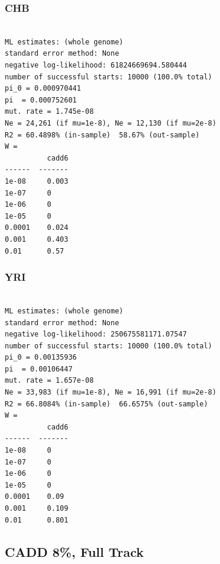 \documentclass[11pt]{article}
\begin{document}
\subsubsection*{CHB}
\begin{minipage}{\linewidth}\begin{footnotesize}
\begin{verbatim}

ML estimates: (whole genome)
standard error method: None
negative log-likelihood: 61824669694.580444
number of successful starts: 10000 (100.0% total)
pi_0 = 0.000970441
pi  = 0.000752601
mut. rate = 1.745e-08 
Ne = 24,261 (if mu=1e-8), Ne = 12,130 (if mu=2e-8)
R2 = 60.4898% (in-sample)  58.67% (out-sample)
W = 
          cadd6
------  -------
1e-08     0.003
1e-07     0
1e-06     0
1e-05     0
0.0001    0.024
0.001     0.403
0.01      0.57
\end{verbatim}
\end{footnotesize}\end{minipage}


\subsubsection*{YRI}
\begin{minipage}{\linewidth}\begin{footnotesize}
\begin{verbatim}

ML estimates: (whole genome)
standard error method: None
negative log-likelihood: 250675581171.07547
number of successful starts: 10000 (100.0% total)
pi_0 = 0.00135936
pi  = 0.00106447
mut. rate = 1.657e-08 
Ne = 33,983 (if mu=1e-8), Ne = 16,991 (if mu=2e-8)
R2 = 66.8084% (in-sample)  66.6575% (out-sample)
W = 
          cadd6
------  -------
1e-08     0
1e-07     0
1e-06     0
1e-05     0
0.0001    0.09
0.001     0.109
0.01      0.801
\end{verbatim}
\end{footnotesize}\end{minipage}


\subsection{CADD 8\%, Full Track}
\end{document}
